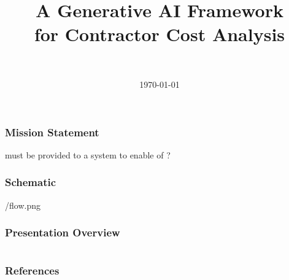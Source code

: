 \documentclass{beamer}
\title[Generative AI Framework for Cost Analysis]{A Generative AI Framework\\ for Contractor Cost Analysis}
\author[\hLogoBAE \phantom{wwwwwwwwwwwwwwwwwwwwww} \TopaBAE]{\TopaBAE \\ \TopaBAEEmail}
\institute{\bae}
\date{\today}
\begin{document}
\begin{frame}
    \titlepage
\end{frame}

\begin{frame}
\frametitle{Mission Statement}
\begin{center}
		 must be provided to a  system to enable  of ?
\end{center}
\end{frame}
\begin{frame}
\frametitle{Schematic}
\center
	\begin{overpic}[ scale = 0.15 ]
		{\pGraphics/flow.png}
	\end{overpic}%
\end{frame}

\begin{frame}[ allowframebreaks ]\frametitle{Presentation Overview}
    \tableofcontents
\end{frame}

	
	
	
	
	

\appendix


\section{} %
\begin{frame}[ allowframebreaks ]
    \frametitle{References}
    \printbibliography
\end{frame}

\begin{frame}
    \titlepage
\end{frame}
\end{document}
